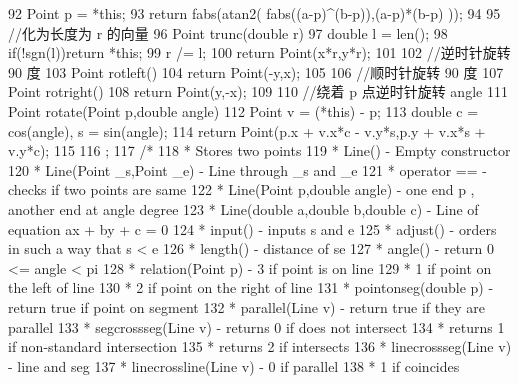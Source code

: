 \documentclass[11pt]{article}
\begin{document}
\begin{Code}
{{ 92        Point p = *this;
 93        return fabs(atan2( fabs((a-p)^(b-p)),(a-p)*(b-p) ));
 94    }
 95    //化为长度为 r 的向量
 96    Point trunc(double r){
 97        double l = len();
 98        if(!sgn(l))return *this;
 99        r /= l;
100        return Point(x*r,y*r);
101    }
102    //逆时针旋转 90 度
103    Point rotleft(){
104        return Point(-y,x);
105    }
106    //顺时针旋转 90 度
107    Point rotright(){
108        return Point(y,-x);
109    }
110    //绕着 p 点逆时针旋转 angle
111    Point rotate(Point p,double angle){
112        Point v = (*this) - p;
113        double c = cos(angle), s = sin(angle);
114        return Point(p.x + v.x*c - v.y*s,p.y + v.x*s + v.y*c);
115    }
116 };
117 /*
118 * Stores two points
119 * Line()                         - Empty constructor
120 * Line(Point _s,Point _e)        - Line through _s and _e
121 * operator ==                    - checks if two points are same
122 * Line(Point p,double angle)     - one end p , another end at
       angle degree
123 * Line(double a,double b,double c) - Line of equation ax + by + c
       = 0
124 * input()                        - inputs s and e
125 * adjust()                       - orders in such a way that s < e
126 * length()                       - distance of se
127 * angle()                        - return 0 <= angle < pi
128 * relation(Point p)              - 3 if point is on line
129 *                                  1 if point on the left of line
130 *                                  2 if point on the right of line
131 * pointonseg(double p)           - return true if point on segment
132 * parallel(Line v)               - return true if they are
       parallel
133 * segcrossseg(Line v)            - returns 0 if does not intersect
134 *                                  returns 1 if non-standard
       intersection
135 *                                  returns 2 if intersects
136 * linecrossseg(Line v)           - line and seg
137 * linecrossline(Line v)          - 0 if parallel
138 *                                  1 if coincides



\end{Code}
\end{document}
